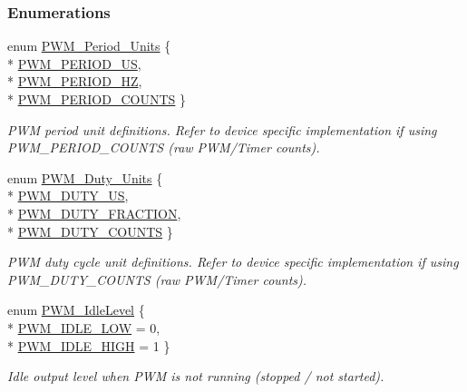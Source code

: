 \subsubsection*{Enumerations}
\begin{DoxyCompactItemize}
\item 
enum \hyperlink{_p_w_m_8h_a11aa442e82549992c98729216d64fd63}{P\+W\+M\+\_\+\+Period\+\_\+\+Units} \{ \\*
\hyperlink{_p_w_m_8h_a11aa442e82549992c98729216d64fd63a35d73e8e481d16fd8c3880d9519894cd}{P\+W\+M\+\_\+\+P\+E\+R\+I\+O\+D\+\_\+\+U\+S}, 
\\*
\hyperlink{_p_w_m_8h_a11aa442e82549992c98729216d64fd63a083c3462c199f39afc7a9d0541595b7a}{P\+W\+M\+\_\+\+P\+E\+R\+I\+O\+D\+\_\+\+H\+Z}, 
\\*
\hyperlink{_p_w_m_8h_a11aa442e82549992c98729216d64fd63a52a5ee3b990d5edb816d19253bd9a571}{P\+W\+M\+\_\+\+P\+E\+R\+I\+O\+D\+\_\+\+C\+O\+U\+N\+T\+S}
 \}
\begin{DoxyCompactList}\small\item\em P\+W\+M period unit definitions. Refer to device specific implementation if using P\+W\+M\+\_\+\+P\+E\+R\+I\+O\+D\+\_\+\+C\+O\+U\+N\+T\+S (raw P\+W\+M/\+Timer counts). \end{DoxyCompactList}\item 
enum \hyperlink{_p_w_m_8h_abc7bc5565f2767cf9f06c1572044a8ee}{P\+W\+M\+\_\+\+Duty\+\_\+\+Units} \{ \\*
\hyperlink{_p_w_m_8h_abc7bc5565f2767cf9f06c1572044a8eeaf93cd02d0c2744e2d6a68a8e7070b7a6}{P\+W\+M\+\_\+\+D\+U\+T\+Y\+\_\+\+U\+S}, 
\\*
\hyperlink{_p_w_m_8h_abc7bc5565f2767cf9f06c1572044a8eea004d0d56bfc7f629990e7b6b55c3dd4f}{P\+W\+M\+\_\+\+D\+U\+T\+Y\+\_\+\+F\+R\+A\+C\+T\+I\+O\+N}, 
\\*
\hyperlink{_p_w_m_8h_abc7bc5565f2767cf9f06c1572044a8eea4a20018a9620ed669dff0893858a44b2}{P\+W\+M\+\_\+\+D\+U\+T\+Y\+\_\+\+C\+O\+U\+N\+T\+S}
 \}
\begin{DoxyCompactList}\small\item\em P\+W\+M duty cycle unit definitions. Refer to device specific implementation if using P\+W\+M\+\_\+\+D\+U\+T\+Y\+\_\+\+C\+O\+U\+N\+T\+S (raw P\+W\+M/\+Timer counts). \end{DoxyCompactList}\item 
enum \hyperlink{_p_w_m_8h_a5a40c7014745d15b0c1a604dae5593f9}{P\+W\+M\+\_\+\+Idle\+Level} \{ \\*
\hyperlink{_p_w_m_8h_a5a40c7014745d15b0c1a604dae5593f9a698cc876a94b3e0629d65fecfec8c8f5}{P\+W\+M\+\_\+\+I\+D\+L\+E\+\_\+\+L\+O\+W} = 0, 
\\*
\hyperlink{_p_w_m_8h_a5a40c7014745d15b0c1a604dae5593f9a0b126918629a951139ef9f17d417c50d}{P\+W\+M\+\_\+\+I\+D\+L\+E\+\_\+\+H\+I\+G\+H} = 1
 \}
\begin{DoxyCompactList}\small\item\em Idle output level when P\+W\+M is not running (stopped / not started). \end{DoxyCompactList}\end{DoxyCompactItemize}
